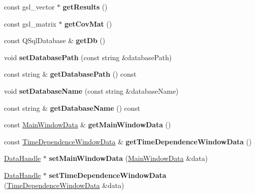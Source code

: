 \begin{DoxyCompactItemize}
\item 
\hypertarget{classDataHandle_aca0c6a382154db5b6a0478e7a7b11b9d}{const gsl\+\_\+vector $\ast$ {\bfseries get\+Results} ()}\label{classDataHandle_aca0c6a382154db5b6a0478e7a7b11b9d}

\item 
\hypertarget{classDataHandle_adc2ab1469d9c9e68779de939945de545}{const gsl\+\_\+matrix $\ast$ {\bfseries get\+Cov\+Mat} ()}\label{classDataHandle_adc2ab1469d9c9e68779de939945de545}

\item 
\hypertarget{classDataHandle_a5693f364f55b8ca38485be73bb186b60}{const Q\+Sql\+Database \& {\bfseries get\+Db} ()}\label{classDataHandle_a5693f364f55b8ca38485be73bb186b60}

\item 
\hypertarget{classDataHandle_a845b2bb0537fb34e4ad037beb453e36b}{void {\bfseries set\+Database\+Path} (const string \&database\+Path)}\label{classDataHandle_a845b2bb0537fb34e4ad037beb453e36b}

\item 
\hypertarget{classDataHandle_a0a6efa3f5bc4f09a72299135e91b7c36}{const string \& {\bfseries get\+Database\+Path} () const }\label{classDataHandle_a0a6efa3f5bc4f09a72299135e91b7c36}

\item 
\hypertarget{classDataHandle_a302e1fc204cb37b5bb5ad339e8366160}{void {\bfseries set\+Database\+Name} (const string \&database\+Name)}\label{classDataHandle_a302e1fc204cb37b5bb5ad339e8366160}

\item 
\hypertarget{classDataHandle_aea4035af37d6f02460fcabd3667738f9}{const string \& {\bfseries get\+Database\+Name} () const }\label{classDataHandle_aea4035af37d6f02460fcabd3667738f9}

\item 
\hypertarget{classDataHandle_a138330c0f643216df97c21ba9a66f39d}{const \hyperlink{structMainWindowData}{Main\+Window\+Data} \& {\bfseries get\+Main\+Window\+Data} ()}\label{classDataHandle_a138330c0f643216df97c21ba9a66f39d}

\item 
\hypertarget{classDataHandle_aa2cf69d01f6f13bee0d7148d1d93fa76}{const \hyperlink{structTimeDependenceWindowData}{Time\+Dependence\+Window\+Data} \& {\bfseries get\+Time\+Dependence\+Window\+Data} ()}\label{classDataHandle_aa2cf69d01f6f13bee0d7148d1d93fa76}

\item 
\hypertarget{classDataHandle_ab4c6f5c3d66408ebe62f668c30b23c50}{\hyperlink{classDataHandle}{Data\+Handle} $\ast$ {\bfseries set\+Main\+Window\+Data} (\hyperlink{structMainWindowData}{Main\+Window\+Data} \&data)}\label{classDataHandle_ab4c6f5c3d66408ebe62f668c30b23c50}

\item 
\hypertarget{classDataHandle_a4f353c55c8e8a8b0632c9a1c3bb0d9e8}{\hyperlink{classDataHandle}{Data\+Handle} $\ast$ {\bfseries set\+Time\+Dependence\+Window\+Data} (\hyperlink{structTimeDependenceWindowData}{Time\+Dependence\+Window\+Data} \&data)}\label{classDataHandle_a4f353c55c8e8a8b0632c9a1c3bb0d9e8}

\end{DoxyCompactItemize}

